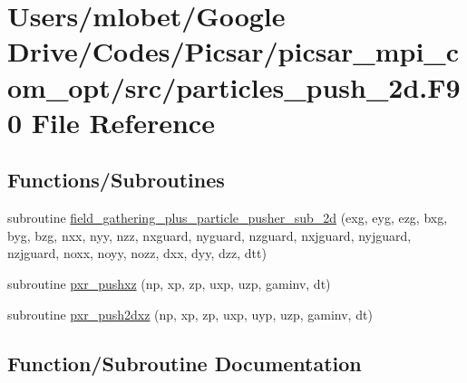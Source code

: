 \hypertarget{particles__push__2d_8_f90}{}\section{Users/mlobet/\+Google Drive/\+Codes/\+Picsar/picsar\+\_\+mpi\+\_\+com\+\_\+opt/src/particles\+\_\+push\+\_\+2d.F90 File Reference}
\label{particles__push__2d_8_f90}
\subsection*{Functions/\+Subroutines}
\begin{DoxyCompactItemize}
\item 
subroutine \hyperlink{particles__push__2d_8_f90_a1498d53375cbc1abc8366bb22720df98}{field\+\_\+gathering\+\_\+plus\+\_\+particle\+\_\+pusher\+\_\+sub\+\_\+2d} (exg, eyg, ezg, bxg, byg, bzg, nxx, nyy, nzz, nxguard, nyguard, nzguard, nxjguard, nyjguard, nzjguard, noxx, noyy, nozz, dxx, dyy, dzz, dtt)
\item 
subroutine \hyperlink{particles__push__2d_8_f90_a91aeb80861b58a94e7ffc6161dfe8ace}{pxr\+\_\+pushxz} (np, xp, zp, uxp, uzp, gaminv, dt)
\item 
subroutine \hyperlink{particles__push__2d_8_f90_ae7614cd9c00b7544eae3c20b1e99505d}{pxr\+\_\+push2dxz} (np, xp, zp, uxp, uyp, uzp, gaminv, dt)
\end{DoxyCompactItemize}


\subsection{Function/\+Subroutine Documentation}
